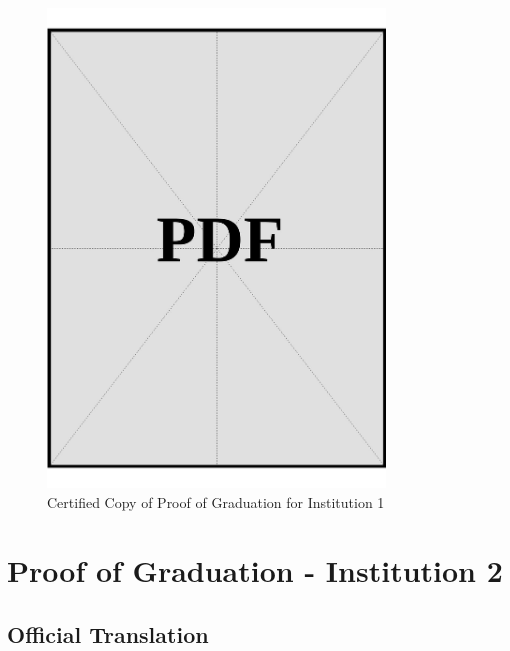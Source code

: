 \begin{figure}[h]
    \centering
    \includegraphics[page=1, width=0.8\textwidth]{../application-docs/applicant/post-secondary-institutions/institution-1/proof-of-graduation/certified-copies.pdf}
    \caption{Certified Copy of Proof of Graduation for Institution 1}
    \label{fig:institution-1-proof-of-graduation-certified-copy}
\end{figure}

\vspace*{\fill}
\clearpage

\section{Proof of Graduation - Institution 2}\label{sec:institution-2-proof-of-graduation}


\subsection*{Official Translation}
\vspace*{\fill}

